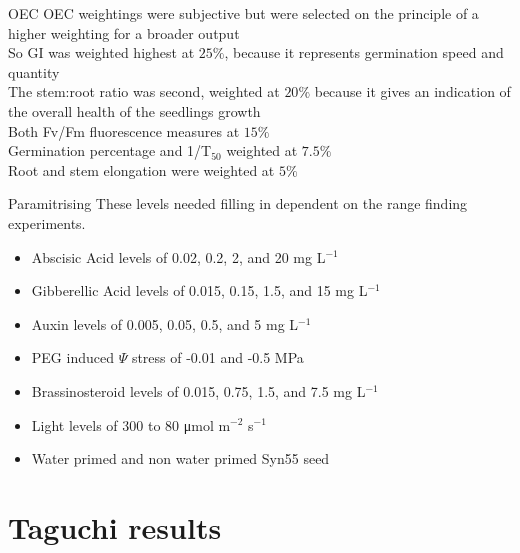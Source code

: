 \documentclass[10pt]{beamer}
\begin{document}
\begin{frame}[fragile]{OEC}
  OEC weightings were subjective but were selected on the principle of a higher weighting for a broader output \\ \vspace{2mm}
  So GI was weighted highest at $25\%$, because it represents germination speed and quantity \\ \vspace{2mm}
  The stem:root ratio was second, weighted at $20\%$ because it gives an indication of the overall health of the seedlings growth \\ \vspace{2mm}
  Both Fv/Fm fluorescence measures at $15\%$ \\ \vspace{2mm}
  Germination percentage and 1/T$_{50}$ weighted at $7.5\%$ \\ \vspace{2mm}
  Root and stem elongation were weighted at $5\%$ \\ \vspace{2mm}
\end{frame}


\begin{frame}{Paramitrising}
	These levels needed filling in dependent on the range finding experiments.   \newline
   	\begin{itemize}[<+->]
                \pause
	      \item[] Abscisic Acid  levels of 0.02, 0.2, 2, and 20 mg L$^{-1}$
                \item[] Gibberellic Acid levels of  0.015, 0.15, 1.5, and 15 mg L$^{-1}$ 
                \item[] Auxin levels of 0.005, 0.05, 0.5, and 5 mg  L$^{-1}$
                \item[] PEG induced $\Psi$ stress of -0.01  and -0.5 MPa 
                \item[] Brassinosteroid levels of 0.015, 0.75, 1.5, and 7.5 mg  L$^{-1}$
                \item[] Light levels of 300 to 80 μmol m$^{-2}$ s$^{-1}$ 
                \item[] Water primed and non water primed Syn55 seed
	\end{itemize}
\end{frame}



\section{Taguchi results}
\end{document}
